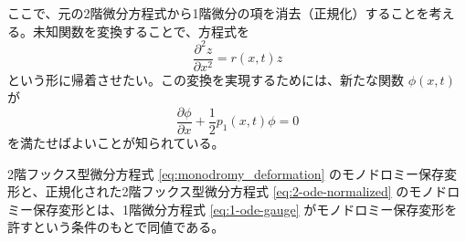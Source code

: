 ここで、元の2階微分方程式から1階微分の項を消去（正規化）することを考える。未知関数を変換することで、方程式を
\begin{equation}\label{eq:2-ode-normalized}
\frac{\partial^{2}z}{\partial x^{2}} = r(x,t)z
\end{equation}
という形に帰着させたい。この変換を実現するためには、新たな関数 $\phi(x,t)$ が
\begin{equation}\label{eq:1-ode-gauge}
\frac{\partial \phi}{\partial x} + \frac{1}{2}p_{1}(x,t)\phi = 0
\end{equation}
を満たせばよいことが知られている。

\begin{proposition}\label{prop:equivalence_2_ode}
    2階フックス型微分方程式 \eqref{eq:monodromy_deformation} のモノドロミー保存変形と、正規化された2階フックス型微分方程式 \eqref{eq:2-ode-normalized} のモノドロミー保存変形とは、1階微分方程式 \eqref{eq:1-ode-gauge} がモノドロミー保存変形を許すという条件のもとで同値である。
\end{proposition}

